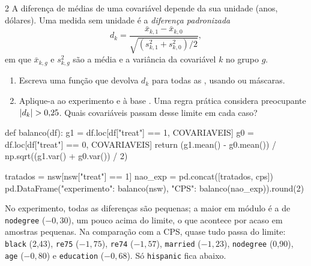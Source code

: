 \documentclass[lista]{tmlnotas}
\begin{document}
\begin{exercicio}{2}
A diferença de médias de uma covariável depende da sua unidade (anos, dólares).
Uma medida sem unidade é a \emph{diferença padronizada}
\[
  d_k = \frac{\bar x_{k,1} - \bar x_{k,0}}{\sqrt{(s_{k,1}^2 + s_{k,0}^2)/2}},
\]
em que $\bar x_{k,g}$ e $s_{k,g}^2$ são a média e a variância da covariável $k$
no grupo $g$.
\begin{enumerate}[label=(\alph*)]
  \item Escreva uma função  que devolva $d_k$ para todas as
        , usando  ou máscaras.
  \item Aplique-a ao experimento e à base .
        Uma regra prática considera preocupante $\lvert d_k\rvert > 0{,}25$. Quais
        covariáveis passam desse limite em cada caso?
\end{enumerate}
\end{exercicio}
\begin{solucao}
\begin{codigo}
def balanco(df):
    g1 = df.loc[df["treat"] == 1, COVARIAVEIS]
    g0 = df.loc[df["treat"] == 0, COVARIAVEIS]
    return (g1.mean() - g0.mean()) / np.sqrt((g1.var() + g0.var()) / 2)

tratados = nsw[nsw["treat"] == 1]
nao_exp = pd.concat([tratados, cps])
pd.DataFrame({"experimento": balanco(nsw),
              "CPS": balanco(nao_exp)}).round(2)
\end{codigo}
No experimento, todas as diferenças são pequenas; a maior em módulo é a de
\texttt{nodegree} ($-0{,}30$), um pouco acima do limite, o que acontece por acaso
em amostras pequenas. Na comparação com a CPS, quase tudo passa do limite:
\texttt{black} (2,43), \texttt{re75} ($-1{,}75$), \texttt{re74} ($-1{,}57$),
\texttt{married} ($-1{,}23$), \texttt{nodegree} (0,90), \texttt{age}
($-0{,}80$) e \texttt{education} ($-0{,}68$). Só \texttt{hispanic} fica abaixo.
\end{solucao}
\end{document}
